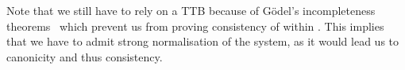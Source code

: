Note that we still have to rely on a \acrshort{TTB} because of Gödel's
incompleteness theorems~\misref{} which prevent us from proving consistency of
\Coq within \Coq.
This implies that we have to admit strong normalisation of the system, as it
would lead us to canonicity and thus consistency.